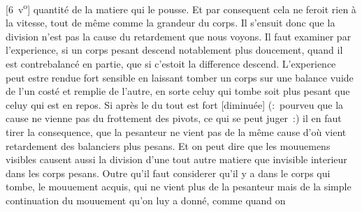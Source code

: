 [6~v\textsuperscript{o}] quantit\'{e} de la matiere\protect{} qui le pousse.
Et par consequent cela ne feroit rien \`{a} la vitesse\protect{}, tout de m\^{e}me comme la grandeur du corps.
Il s'ensuit donc que la division n'est pas la cause du retardement que nous voyons.
Il faut examiner par l'experience, si un corps pesant descend notablement plus doucement, quand il est contrebalanc\'{e} en partie, que si c'estoit la difference
descend. L'experience peut estre rendue fort sensible en laissant tomber un corps sur une balance vuide de l'un cost\'{e} et remplie de l'autre, en sorte
celuy qui tombe soit plus pesant que celuy qui est en repos.
Si apr\`{e}s le 
du tout est fort [diminu\'{e}e]
(:~pourveu que la cause ne vienne pas du frottement\protect{} des pivots, ce qui se peut juger~:)
il en faut tirer la consequence, que la pesanteur\protect{} ne vient pas de la m\^{e}me cause d'o\`{u} vient
retardement des balanciers\protect{} plus pesans.
Et on peut dire que les mouuemens visibles causent aussi la division d'une tout autre matiere que
invisible interieur dans les corps pesans.
\pend
\count{}
\count{}
\pstart
Outre qu'il faut considerer qu'il y a dans le corps qui tombe, le mouuement acquis, qui ne vient plus de la pesanteur mais de la simple continuation du mouuement qu'on luy a donn\'{e}, comme quand on
